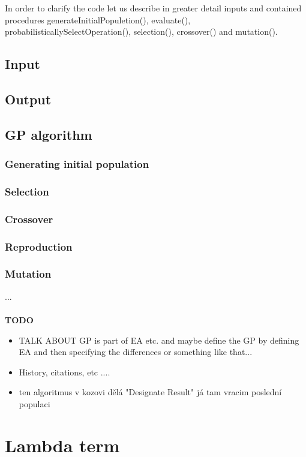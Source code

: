 \documentclass[12pt,a4paper]{report}
\begin{document}
In order to clarify the code let us describe in greater detail inputs and
contained procedures
generateInitialPopuletion(),
evaluate(),
probabilisticallySelectOperation(),
selection(),
crossover() 
and mutation().






	\subsection{Input}
	\subsection{Output}
	\subsection{GP algorithm}
		\subsubsection{Generating initial population}
		\subsubsection{Selection}
		\subsubsection{Crossover}
		\subsubsection{Reproduction}
		\subsubsection{Mutation}


    ...
	\\\\
	\textbf{TODO}
	\begin{itemize} 
		\item TALK ABOUT GP is part of EA etc. and maybe define the GP by defining EA and then
		      specifying the differences or something like that...    
		\item History, citations, etc ....
		\item ten algoritmus v kozovi dělá "Designate Result" já tam vracim poslední populaci
	\end{itemize}	  
		
\section{Lambda term}
\label{deflam}
	
\end{document}
